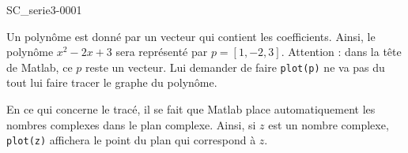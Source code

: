 \begin{corrige}{SC_serie3-0001}

Un polynôme est donné par un vecteur qui contient les coefficients. Ainsi, le polynôme $x^2-2x+3$ sera représenté par $p =[1,-2,3]$. Attention : dans la tête de Matlab, ce $p$ reste un vecteur. Lui demander de faire \verb+plot(p)+ ne va pas du tout lui faire tracer le graphe du polynôme.

En ce qui concerne le tracé, il se fait que Matlab place automatiquement les nombres complexes dans le plan complexe. Ainsi, si $z$ est un nombre complexe, \verb+plot(z)+ affichera le point du plan qui correspond à $z$.



\end{corrige}
